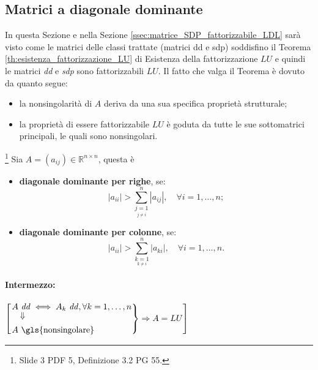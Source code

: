 \subsection{Matrici a diagonale dominante}\label{ssec:matrici_diagonale_dominante}
In questa Sezione e nella Sezione \ref{ssec:matrice_SDP_fattorizzabile_LDL} sarà visto come le matrici delle classi trattate (matrici dd e sdp) soddisfino il Teorema \ref{th:esistenza_fattorizzazione_LU} di Esistenza della fattorizzazione $LU$ e quindi le matrici \textit{dd} e \textit{sdp} sono fattorizzabili $LU$. Il fatto che valga il Teorema è dovuto da quanto segue:
\begin{itemize}
	\item la nonsingolarità di $A$ deriva da una sua specifica proprietà strutturale;
	\item la proprietà di essere fattorizzabile $LU$ è goduta da tutte le sue sottomatrici principali, le quali sono nonsingolari.
\end{itemize}
\begin{definition}\label{def:matrice_diagonale_dominante}\footnote{Slide 3 PDF 5, Definizione 3.2 PG 55.}
    Sia $A=(a_{ij})\in\mathbb R^{n\times n}$, questa è
    \begin{itemize}
        \item \textbf{diagonale dominante per righe}, se:
        \begin{equation}\label{eq:matrice_diagonale_dominante_righe}
            |a_{ii}|>\sum_{\underset{j\neq i}{j=1}}^n |a_{ij}|,\quad 
            \forall i=1,\hdots, n;
        \end{equation}
        \item \textbf{diagonale dominante per colonne}, se:
        \begin{equation*}
            |a_{ii}|>\sum_{\underset{k\neq i}{k=1}}^n|a_{ki}|,\quad \forall i=1,\hdots,n.
        \end{equation*}
    \end{itemize}
\end{definition}

\paragraph{Intermezzo:}{$\left[\begin{rcases}
		\Vrightarrow{A\text{ \textit{dd}}}{}\iff A_k\text{ \textit{dd}}, \forall k=1,\hdots,n\\
		A\text{ \gls{nonsingolare}}
	\end{rcases}\Rightarrow A=LU\right]$}

